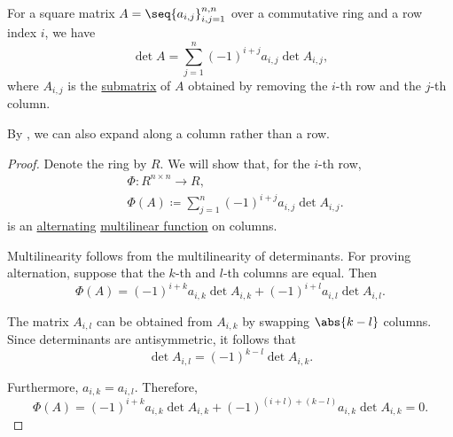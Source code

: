 \begin{theorem}\label{thm:laplace_expansion}
  For a square matrix \( A = \seq{ a_{i,j} }_{i,j=1}^{n,n} \) over a commutative ring and a row index \( i \), we have
  \begin{equation*}
    \det A = \sum_{j=1}^n (-1)^{i + j} a_{i,j} \det A_{i,j},
  \end{equation*}
  where \( A_{i,j} \) is the \hyperref[def:submatrix]{submatrix} of \( A \) obtained by removing the \( i \)-th row and the \( j \)-th column.

  By , we can also expand along a column rather than a row.
\end{theorem}
\begin{proof}
  Denote the ring by \( R \). We will show that, for the \( i \)-th row,
  \begin{equation*}
    \begin{aligned}
      &\Phi: R^{n \times n} \to R, \\
      &\Phi(A) \coloneqq \sum_{j=1}^n (-1)^{i + j} a_{i,j} \det A_{i,j}.
    \end{aligned}
  \end{equation*}
  is an \hyperref[def:alternating_function]{alternating} \hyperref[def:multilinear_function]{multilinear function} on columns.

  Multilinearity follows from the multilinearity of determinants. For proving alternation, suppose that the \( k \)-th and \( l \)-th columns are equal. Then
  \begin{equation*}
    \Phi(A) = (-1)^{i + k} a_{i,k} \det A_{i,k} + (-1)^{i + l} a_{i,l} \det A_{i,l}.
  \end{equation*}

  The matrix \( A_{i,l} \) can be obtained from \( A_{i,k} \) by swapping \( \abs{k - l} \) columns. Since determinants are antisymmetric, it follows that
  \begin{equation*}
    \det A_{i,l} = (-1)^{k - l} \det A_{i,k}.
  \end{equation*}

  Furthermore, \( a_{i,k} = a_{i,l} \). Therefore,
  \begin{equation*}
    \Phi(A) = (-1)^{i + k} a_{i,k} \det A_{i,k} + (-1)^{(i + l) + (k - l)} a_{i,k} \det A_{i,k} = 0.
  \end{equation*}
\end{proof}

